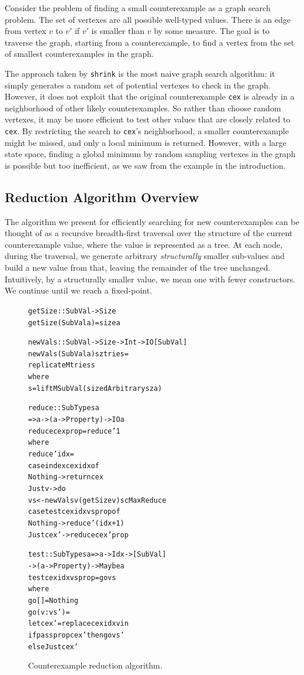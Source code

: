 \documentclass[10pt]{sigplanconf}
\newenvironment{code}{\begin{alltt}}{\end{alltt}}
\newcommand{\ttp}[1]{\texttt{#1}}
\begin{document}
Consider the problem of finding a small counterexample as a graph search
problem.  The set of vertexes are all possible well-typed values.  There is an
edge from vertex $v$ to $v'$ if $v'$ is smaller than $v$ by some measure.  The
goal is to traverse the graph, starting from a counterexample, to find a vertex
from the set of smallest counterexamples in the graph.

The approach taken by \ttp{shrink} is the most naive graph search algorithm: it
simply generates a random set of potential vertexes to check in the graph.
However, it does not exploit that the original counterexample \ttp{cex} is
already in a neighborhood of other likely counterexamples.  So rather than
choose random vertexes, it may be more efficient to test other values that are
closely related to \ttp{cex}.  By restricting the search to \ttp{cex}'s
neighborhood, a smaller counterexample might be missed, and only a local minimum
is returned.  However, with a large state space, finding a global minimum by
random sampling vertexes in the graph is possible but too inefficient, as we saw
from the example in the introduction.

\subsection{Reduction Algorithm Overview}\label{sec:reduct}
The algorithm we present for efficiently searching for new counterexamples can
be thought of as a recursive breadth-first traversal over the structure of the
current counterexample value, where the value is represented as a tree.  At each
node, during the traversal, we generate arbitrary \emph{structurally} smaller
sub-values and build a new value from that, leaving the remainder of the tree
unchanged.  Intuitively, by a structurally smaller value, we mean one with fewer
constructors.  We continue until we reach a fixed-point.


\begin{figure}[ht]
  \begin{code}
getSize :: SubVal -> Size
getSize (SubVal a) = size a

newVals :: SubVal -> Size -> Int -> IO [SubVal]
newVals (SubVal a) sz tries =
  replicateM tries s
  where
  s  = liftM SubVal (sizedArbitrary sz a)

reduce :: SubTypes a
       => a -> (a -> Property) -> IO a
reduce cex prop = reduce' 1
  where
  reduce' idx =
    case index cex idx of
      Nothing -> return cex
      Just v  -> do
        vs <- newVals v (getSize v) scMaxReduce
        case test cex idx vs prop of
          Nothing   -> reduce' (idx+1)
          Just cex' -> reduce cex' prop

test :: SubTypes a => a -> Idx -> [SubVal]
     -> (a -> Property) -> Maybe a
test cex idx vs prop = go vs
  where
  go []      = Nothing
  go (v:vs') =
    let cex' = replace cex idx v in
    if pass prop cex' then go vs'
      else Just cex'
  \end{code}
  \caption{Counterexample reduction algorithm.\label{fig:reduction}}
\end{figure}
\end{document}
